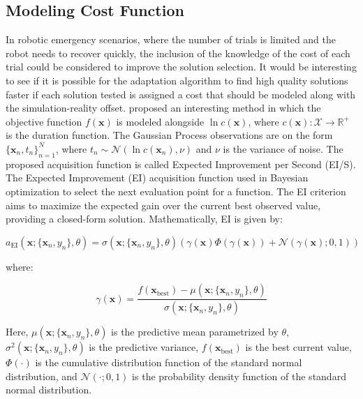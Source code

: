 \documentclass[12pt]{article}
\begin{document}
\subsection{Modeling Cost Function}
In robotic emergency scenarios, where the number of trials is limited and the robot needs to recover quickly, the inclusion of the knowledge of the cost of each trial could be considered to improve the solution selection. It would be interesting to see if it is possible for the adaptation algorithm to find high quality solutions faster if each solution tested is assigned a cost that should be modeled along with the simulation-reality offset. \citet{Snoek2014BayesianOA} proposed an interesting method in which the objective function $f(\mathbf{x})$ is modeled alongside $\ln c(\mathbf{x})$, where $c(\mathbf{x}): \mathcal{X} \rightarrow \mathbb{R}^+$ is the duration function. The Gaussian Process observations are on the form  \(\{ \mathbf{x}_n, t_n \}_{n=1}^N\), where \( t_n \sim \mathcal{N}(\ln c(\mathbf{x}_n), \nu) \) and \(\nu\) is the variance of noise. The proposed acquisition function is called Expected Improvement per Second (EI/S). The Expected Improvement (EI) acquisition function used in Bayesian optimization to select the next evaluation point for a function. The EI criterion aims to maximize the expected gain over the current best observed value, providing a closed-form solution. Mathematically, EI is given by:

\begin{equation}
\label{eq:EI}
a_{\text{EI}}(\mathbf{x} ; \{\mathbf{x}_n, y_n\}, \theta) = \sigma(\mathbf{x} ; \{\mathbf{x}_n, y_n\}, \theta) \left( \gamma(\mathbf{x}) \Phi(\gamma(\mathbf{x})) + \mathcal{N}(\gamma(\mathbf{x}) ; 0, 1) \right)
\end{equation}

where:

\begin{equation}
\label{eq:gamma}
\gamma(\mathbf{x}) = \frac{f(\mathbf{x}_{\text{best}}) - \mu(\mathbf{x} ; \{\mathbf{x}_n, y_n\}, \theta)}{\sigma(\mathbf{x} ; \{\mathbf{x}_n, y_n\}, \theta)}
\end{equation}

Here, \(\mu(\mathbf{x} ; \{\mathbf{x}_n, y_n\}, \theta)\) is the predictive mean parametrized by $\theta$, \(\sigma^2(\mathbf{x} ; \{\mathbf{x}_n, y_n\}, \theta)\) is the predictive variance, \(f(\mathbf{x}_{\text{best}})\) is the best current value, \(\Phi(\cdot)\) is the cumulative distribution function of the standard normal distribution, and \(\mathcal{N}(\cdot ; 0, 1)\) is the probability density function of the standard normal distribution.
\end{document}
